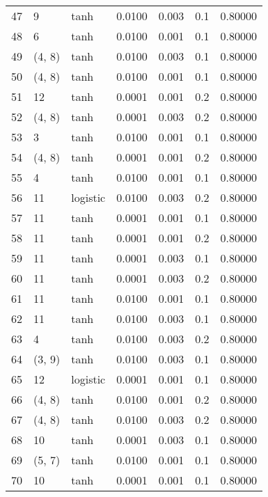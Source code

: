 \begin{tabular}{lllrrrr}
47  &           9 &      tanh &  0.0100 &  0.003 &  0.1 &   0.80000 \\
48  &           6 &      tanh &  0.0100 &  0.001 &  0.1 &   0.80000 \\
49  &      (4, 8) &      tanh &  0.0100 &  0.003 &  0.1 &   0.80000 \\
50  &      (4, 8) &      tanh &  0.0100 &  0.001 &  0.1 &   0.80000 \\
51  &          12 &      tanh &  0.0001 &  0.001 &  0.2 &   0.80000 \\
52  &      (4, 8) &      tanh &  0.0001 &  0.003 &  0.2 &   0.80000 \\
53  &           3 &      tanh &  0.0100 &  0.001 &  0.1 &   0.80000 \\
54  &      (4, 8) &      tanh &  0.0001 &  0.001 &  0.2 &   0.80000 \\
55  &           4 &      tanh &  0.0100 &  0.001 &  0.1 &   0.80000 \\
56  &          11 &  logistic &  0.0100 &  0.003 &  0.2 &   0.80000 \\
57  &          11 &      tanh &  0.0001 &  0.001 &  0.1 &   0.80000 \\
58  &          11 &      tanh &  0.0001 &  0.001 &  0.2 &   0.80000 \\
59  &          11 &      tanh &  0.0001 &  0.003 &  0.1 &   0.80000 \\
60  &          11 &      tanh &  0.0001 &  0.003 &  0.2 &   0.80000 \\
61  &          11 &      tanh &  0.0100 &  0.001 &  0.1 &   0.80000 \\
62  &          11 &      tanh &  0.0100 &  0.003 &  0.1 &   0.80000 \\
63  &           4 &      tanh &  0.0100 &  0.003 &  0.2 &   0.80000 \\
64  &      (3, 9) &      tanh &  0.0100 &  0.003 &  0.1 &   0.80000 \\
65  &          12 &  logistic &  0.0001 &  0.001 &  0.1 &   0.80000 \\
66  &      (4, 8) &      tanh &  0.0100 &  0.001 &  0.2 &   0.80000 \\
67  &      (4, 8) &      tanh &  0.0100 &  0.003 &  0.2 &   0.80000 \\
68  &          10 &      tanh &  0.0001 &  0.003 &  0.1 &   0.80000 \\
69  &      (5, 7) &      tanh &  0.0100 &  0.001 &  0.1 &   0.80000 \\
70  &          10 &      tanh &  0.0001 &  0.001 &  0.1 &   0.80000 \\

\end{tabular}
